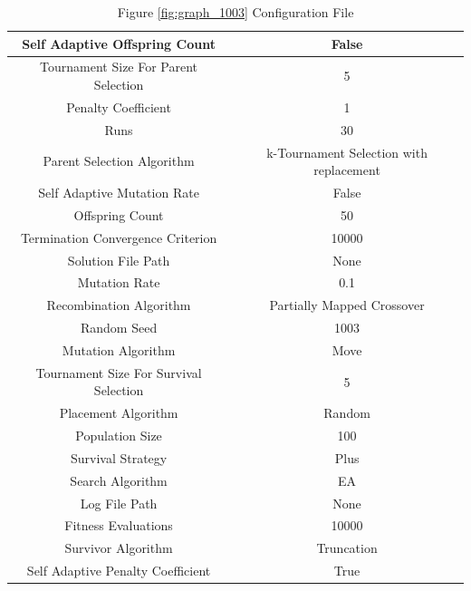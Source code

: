 \documentclass{standalone}
\begin{document}
\begin{table}[!htb]
	\centering
	\caption{Figure \ref{fig:graph_1003} Configuration File}
	\label{tab:graph_1003}
	\begin{tabular}{| c | c |}
		\hline
		Self Adaptive Offspring Count		& False		 \\
		\hline
		Tournament Size For Parent Selection		& 5		 \\
		\hline
		Penalty Coefficient		& 1		 \\
		\hline
		Runs		& 30		 \\
		\hline
		Parent Selection Algorithm		& k-Tournament Selection with replacement		 \\
		\hline
		Self Adaptive Mutation Rate		& False		 \\
		\hline
		Offspring Count		& 50		 \\
		\hline
		Termination Convergence Criterion		& 10000		 \\
		\hline
		Solution File Path		& None		 \\
		\hline
		Mutation Rate		& 0.1		 \\
		\hline
		Recombination Algorithm		& Partially Mapped Crossover		 \\
		\hline
		Random Seed		& 1003		 \\
		\hline
		Mutation Algorithm		& Move		 \\
		\hline
		Tournament Size For Survival Selection		& 5		 \\
		\hline
		Placement Algorithm		& Random		 \\
		\hline
		Population Size		& 100		 \\
		\hline
		Survival Strategy		& Plus		 \\
		\hline
		Search Algorithm		& EA		 \\
		\hline
		Log File Path		& None		 \\
		\hline
		Fitness Evaluations		& 10000		 \\
		\hline
		Survivor Algorithm		& Truncation		 \\
		\hline
		Self Adaptive Penalty Coefficient		& True		 \\
		\hline
	\end{tabular}
\end{table}
\end{document}
